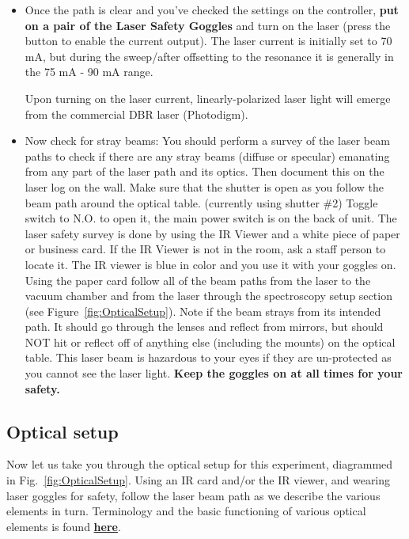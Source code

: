 \documentclass{../lab}
\begin{document}
\begin{itemize}
    \item Once the path is clear and you've checked the settings on the controller, \textbf{put on a pair of the Laser Safety Goggles} and turn on the laser (press the button to enable the current output). The laser current is initially set to 70 mA, but during the sweep/after offsetting to the resonance it is generally in the 75 mA - 90 mA range.
    
    Upon turning on the laser current, linearly-polarized laser light will emerge from the commercial DBR laser (Photodigm).

    \item Now check for stray beams: You should perform a survey of the laser beam paths to check if there are any stray beams (diffuse or specular) emanating from any part of the laser path and its optics. Then document this on the laser log on the wall. Make sure that the shutter is open as you follow the beam path around the optical table. (currently using shutter \#2) Toggle switch to N.O. to open it, the main power switch is on the back of unit. The laser safety survey is done by using the IR Viewer and a white piece of paper or business card. If the IR Viewer is not in the room, ask a staff person to locate it. The IR viewer is blue in color and you use it with your goggles on. Using the paper card follow all of the beam paths from the laser to the vacuum chamber and from the laser through the spectroscopy setup section (see Figure~\ref{fig:OpticalSetup}). Note if the beam strays from its intended path. It should go through the lenses and reflect from mirrors, but should NOT hit or reflect off of anything else (including the mounts) on the optical table. This laser beam is hazardous to your eyes if they are un-protected as you cannot see the laser light. \textbf{Keep the goggles on at all times for your safety.}
    
\end{itemize}

\subsection{Optical setup}

Now let us take you through the optical setup for this experiment, diagrammed in Fig.\ \ref{fig:OpticalSetup}.  Using an IR card and/or the IR viewer, and wearing laser goggles for safety, follow the laser beam path as we describe the various elements in turn.  Terminology and the basic functioning of various optical elements is found \href{https://berkeley-physics111b.github.io/assets/pdf/oldwebsitestructure/Definitions\%20for\%20MOT.pdf}{\textbf{here}}.
\end{document}
